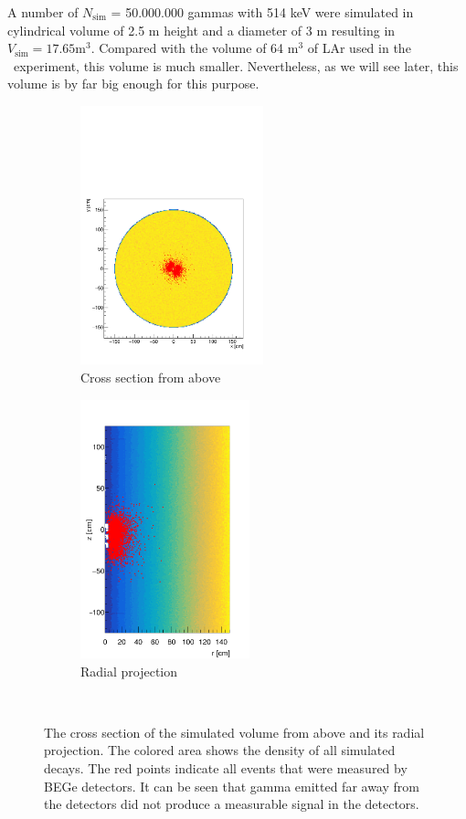 \documentclass[encoding=utf8,british]{tumphthesis}
\begin{document}
A number of $N_{\mathrm{sim}}$ = 50.000.000 gammas with 514 keV were simulated in cylindrical volume of 2.5 m height and a diameter of 3 m resulting in $V_{\mathrm{sim}} = 17.65 \mathrm{m}^3$.
Compared with the volume of 64 m\(^3\) of LAr used in the \gerda\ experiment, this volume is much smaller.
Nevertheless, as we will see later, this volume is by far big enough for this purpose.
\\

\begin{figure}[t!]
	\centering
	\begin{subfigure}{.5\textwidth}
		\centering
		\includegraphics[height=75mm]{./Bilder/MC-Querschnitt-BEGes.pdf}
		\caption{Cross section from above}
		\label{fig:CrossSecAb}
	\end{subfigure}\hfill%
	\begin{subfigure}{.5\textwidth}
		\centering
		\includegraphics[height=75mm]{./Bilder/MC-Radius-BEGes.png}
		\caption{Radial projection}
		\label{fig:CrossSecRa}
	\end{subfigure}
    \\
	\vspace{0.5cm}
    \caption{
    	The cross section of the simulated volume from above and its radial projection.
    	The colored area shows the density of all simulated decays. 
    	The red points indicate all events that were measured by BEGe detectors.
    	It can be seen that gamma emitted far away from the detectors did not produce a measurable signal in the detectors.
    	}
\vspace{0.5cm}
\end{figure}
\\
\end{document}
